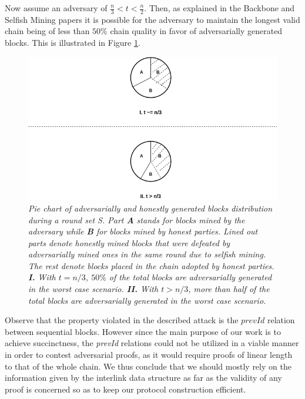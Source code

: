 Now assume an adversary of $ \frac{n}{3} < t < \frac{n}{2} $. Then, as explained in the Backbone and Selfish Mining papers \cite{Backbone}\cite{selfish_mining} it is possible for the adversary to maintain the longest valid chain being of less than $50\%$ chain quality in favor of adversarially generated blocks. This is illustrated in Figure \ref{fig:selfish_mining_pie}. 

\begin{figure}[h!]
	\begin{center}
		\includegraphics[scale=0.55]{figures/selfish_mining_pie.png}
	\end{center}
	\caption{\textit{Pie chart of adversarially and honestly generated blocks distribution during a round set S. Part \textbf{A} stands for blocks mined by the adversary while \textbf{B} for blocks mined by honest parties. Lined out parts denote honestly mined blocks that were defeated by adversarially mined ones in the same round due to selfish mining. The rest denote blocks placed in the chain adopted by honest parties. \textbf{I.} With $t = n/3$, $50\%$ of the total blocks are adversarially generated in the worst case scenario. \textbf{II.} With $t > n/3$, more than half of the total blocks are adversarially generated in the worst case scenario.}}
	\label{fig:selfish_mining_pie}
\end{figure}

Observe that the property violated in the described attack is the $prevId$ relation between sequential blocks. However since the main purpose of our work is to achieve succinctness, the \textit{prevId} relations could not be utilized in a viable manner in order to contest adversarial proofs, as it would require proofs of linear length to that of the whole chain.  We thus conclude that we should mostly rely on the information given by the interlink data structure as far as the validity of any proof is concerned so as to keep our protocol construction efficient.

